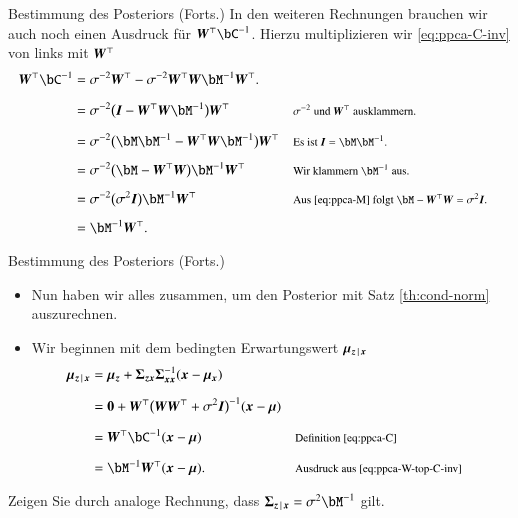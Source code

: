 \begin{frame}{Bestimmung des Posteriors (Forts.)}{}
	In den weiteren Rechnungen brauchen wir auch noch einen Ausdruck für $\bW^\top \bC^{-1}$.
	Hierzu multiplizieren wir \eqref{eq:ppca-C-inv} von links mit $\bm{W}^\top$
	\begin{equation} \label{eq:ppca-W-top-C-inv}
		\begin{aligned}
			\bW^\top \bC^{-1}
				&= \sigma^{-2} \bW^\top - \sigma^{-2} \bW^\top \bW \bM^{-1} \bW^\top.
		\\[2mm]
				&= \sigma^{-2} \bigl( \bI - \bW^\top \bW \bM^{-1} \bigr) \bW^\top
				&& \rem{$\sigma^{-2}$ und $\bW^\top$ ausklammern.}
		\\[2mm]
				&= \sigma^{-2} \bigl( \bM \bM^{-1} - \bW^\top \bW \bM^{-1} \bigr) \bW^\top
				&& \rem{Es ist $\bI = \bM \bM^{-1}$.}
		\\[2mm]
				&= \sigma^{-2} \bigl( \bM - \bW^\top \bW \bigr) \bM^{-1} \bW^\top
				&& \rem{Wir klammern $\bM^{-1}$ aus.}
		\\[2mm]
				&= \sigma^{-2} \bigl( \sigma^2 \bI \bigr) \bM^{-1} \bW^\top
				&& \rem{Aus \eqref{eq:ppca-M} folgt $\bM - \bW^\top \bW = \sigma^2 \bI$.}
		\\[2mm]
				&= \bM^{-1} \bW^\top.
		\end{aligned}
	\end{equation}
\end{frame}


\begin{frame}{Bestimmung des Posteriors (Forts.)}{}
	\begin{itemize}
		\item Nun haben wir alles zusammen, um den Posterior mit Satz \ref{th:cond-norm} auszurechnen.
		\item Wir beginnen mit dem bedingten Erwartungswert $\bm{\mu}_{\bm{z}\,\mid\,\bm{x}}$
		\begin{equation}
			\begin{aligned}
				\bmu_{\bz\,\mid\,\bx}
					&= \bmu_{\bz} + \bSigma_{\bz\bx} \bSigma_{\bx\bx}^{-1} (\bx - \bmu_{\bx})
			\\[2mm]
					&= \0 + \bW^\top \bigl( \bW \bW^\top + \sigma^2 \bI \bigr)^{-1} (\bx - \bmu)
			\\[2mm]
					&= \bW^\top \bC^{-1} (\bx - \bmu)
					&& \rem{Definition \eqref{eq:ppca-C}}
			\\[2mm]
					&= \bM^{-1} \bW^\top (\bx - \bmu).
					&& \rem{Ausdruck aus \eqref{eq:ppca-W-top-C-inv}}
			\end{aligned}
		\end{equation}
	\end{itemize}
	
	\begin{mytask}
		Zeigen Sie durch analoge Rechnung, dass $\bSigma_{\bz\,\mid\,\bx} = \sigma^2 \bM^{-1}$ gilt.
	\end{mytask}
\end{frame}


